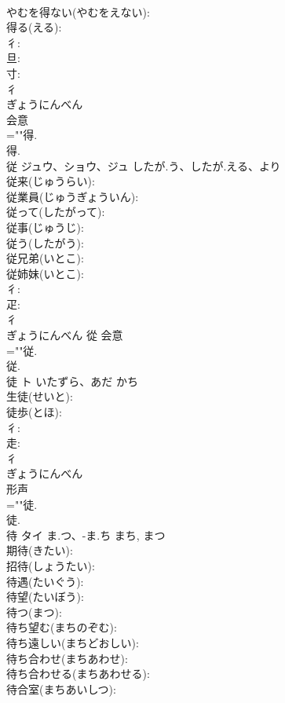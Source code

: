 \documentclass[8pt]{extreport}
\begin{document}
\begin{CJK}{UTF8}{min}
\\	やむを得ない(やむをえない): 
\\	得る(える): 
\\	彳: 
\\	旦: 
\\	寸: 
\\	彳	
\\	ぎょうにんべん	
\\	会意 
\\	=""得.
\\	得.
\\	従	ジュウ、ショウ、ジュ	したが.う、したが.える、より		
\\	従来(じゅうらい): 
\\	従業員(じゅうぎょういん): 
\\	従って(したがって): 
\\	従事(じゅうじ): 
\\	従う(したがう): 
\\	従兄弟(いとこ): 
\\	従姉妹(いとこ): 
\\	彳: 
\\	疋: 
\\	彳	
\\	ぎょうにんべん	從	会意 
\\	=""従.
\\	従.
\\	徒	ト	いたずら、あだ	かち	
\\	生徒(せいと): 
\\	徒歩(とほ): 
\\	彳: 
\\	走: 
\\	彳	
\\	ぎょうにんべん	
\\	形声 
\\	=""徒.
\\	徒.
\\	待	タイ	ま.つ、-ま.ち	まち, まつ	
\\	期待(きたい): 
\\	招待(しょうたい): 
\\	待遇(たいぐう): 
\\	待望(たいぼう): 
\\	待つ(まつ): 
\\	待ち望む(まちのぞむ): 
\\	待ち遠しい(まちどおしい): 
\\	待ち合わせ(まちあわせ): 
\\	待ち合わせる(まちあわせる): 
\\	待合室(まちあいしつ): 

\end{CJK}
\end{document}

